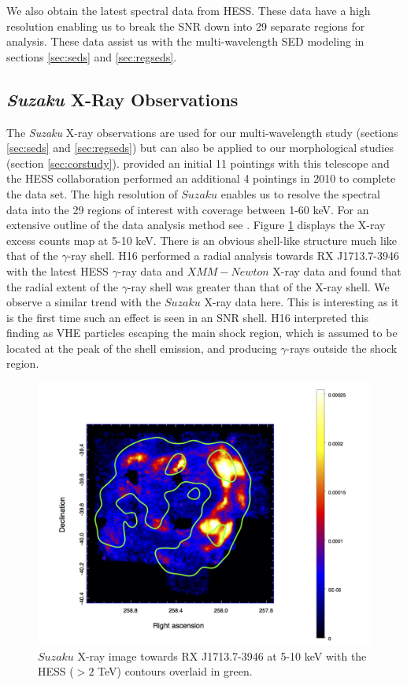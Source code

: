 \documentclass[12pt,a4paper]{article}
\begin{document}
We also obtain the latest spectral data from HESS. These data have a high resolution enabling us to break the SNR down into 29 separate regions for analysis. These data assist us with the multi-wavelength SED modeling in sections \ref{sec:seds} and \ref{sec:regseds}. 

\subsection{\textbf{\textit{Suzaku}} X-Ray Observations}
The \textit{Suzaku} X-ray observations are used for our multi-wavelength study (sections \ref{sec:seds} and \ref{sec:regseds}) but can also be applied to our morphological studies (section \ref{sec:corstudy}). \cite{2008ApJ...685..988T} provided an initial 11 pointings with this telescope and the HESS collaboration performed an additional 4 pointings in 2010 to complete the data set. The high resolution of $\mathit{Suzaku}$ enables us to resolve the spectral data into the 29 regions of interest with coverage between 1-60 keV. For an extensive outline of the data analysis method see \cite{2008ApJ...685..988T}. Figure \ref{fig:suzakumap} displays the X-ray excess counts map at 5-10 keV. There is an obvious shell-like structure much like that of the $\gamma$-ray shell. H16 performed a radial analysis towards RX J1713.7-3946 with the latest HESS $\gamma$-ray data and $\mathit{XMM-Newton}$ X-ray data and found that the radial extent of the $\gamma$-ray shell was greater than that of the X-ray shell. We observe a similar trend with the $\mathit{Suzaku}$ X-ray data here. This is interesting as it is the first time such an effect is seen in an SNR shell. H16 interpreted this finding as VHE particles escaping the main shock region, which is assumed to be located at the peak of the shell emission, and producing $\gamma$-rays outside the shock region. 
\begin{figure}[H]
	\centering
	\includegraphics[width=0.75\linewidth, height=0.36\textheight]{suzaku_map}
	\caption{$\mathit{Suzaku}$ X-ray image towards RX J1713.7-3946 at 5-10 keV with the HESS ($>2$ TeV) contours overlaid in green.}
	\label{fig:suzakumap}
\end{figure}
\end{document}
